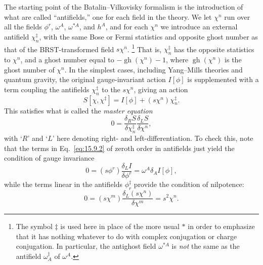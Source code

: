 The starting point of the Batalin--Vilkovisky formalism is the introduction of
what are called ``antifields,'' one for each field in the theory. We let
$\chi^n$ run over all the fields $\phi^r$, $\omega^A$, $\omega^{*A}$, and
$h^A$, and for each $\chi^n$ we introduce an external antifield
$\chi_n^{\ddagger}$, with the same Bose or Fermi statistics and opposite ghost
number as that of the BRST-transformed field $s\chi^n$.
\footnote{The symbol $\ddagger$ is used here in place of the more usual $*$ in
order to emphasize that it has nothing whatever to do with complex
conjugation or charge conjugation. In particular, the antighost field
$\omega^{*A}$ is \emph{not} the same as the antifield
$\omega_A^{\ddagger}$ of $\omega^A$.}
That is, $\chi_n^{\ddagger}$ has the opposite statistics to $\chi^n$, and a
ghost number equal to $-\operatorname{gh}(\chi^n)-1$, where
$\operatorname{gh}(\chi^n)$ is the ghost number of $\chi^n$. In the simplest
cases, including Yang--Mills theories and quantum gravity, the original
gauge-invariant action $I[\phi]$ is supplemented with a term coupling the
antifields $\chi_n^{\ddagger}$ to the $s\chi^n$, giving an action
\begin{equation}
S[\chi,\chi^{\ddagger}]=I[\phi]+(s\chi^n)\chi_n^{\ddagger}.
\tag{15.9.1}\label{eq:15.9.1}
\end{equation}
This satisfies what is called the \emph{master equation}
\begin{equation}
0=\frac{\delta_R S}{\delta\chi_n^{\ddagger}}
  \frac{\delta_L S}{\delta\chi^n},
\tag{15.9.2}\label{eq:15.9.2}
\end{equation}
with `$R$' and `$L$' here denoting right- and left-differentiation. To check
this, note that the terms in Eq.~\eqref{eq:15.9.2} of zeroth order in
antifields just yield the condition of gauge invariance
\begin{equation}
0=(s\phi^r)\frac{\delta_L I}{\delta\phi^r}
  =\omega^A\delta_A I[\phi],
\tag{15.9.3}\label{eq:15.9.3}
\end{equation}
while the terms linear in the antifields $\phi_r^{\ddagger}$ provide the
condition of nilpotence:
\begin{equation}
0=(s\chi^m)\frac{\delta_L(s\chi^n)}{\delta\chi^m}=s^2\chi^n.
\tag{15.9.4}\label{eq:15.9.4}
\end{equation}

